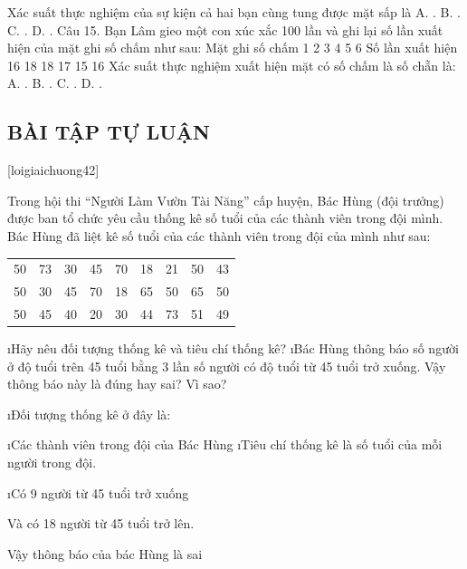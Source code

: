 Xác suất thực nghiệm của sự kiện cả hai bạn cùng tung được mặt sấp là
A.  .	B.  .	C.  .	D.  .
Câu 15. Bạn Lâm gieo một con xúc xắc 100 lần và ghi lại số lần xuất hiện của mặt ghi số chấm như sau:
Mặt ghi số chấm 	1	2	3	4	5	6
Số lần xuất hiện	16	18	18	17	15	16
Xác suất thực nghiệm xuất hiện mặt có số chấm là số chẵn là:
A. .		B.  .	C. .	D. .
\subsection{BÀI TẬP TỰ LUẬN}
[loigiaichuong42]
\begin{bt}
	Trong hội thi “Người Làm Vườn Tài Năng” cấp huyện, Bác Hùng (đội trưởng) được ban tổ chức yêu cầu thống kê số tuổi của các thành viên trong đội mình. Bác Hùng đã liệt kê số tuổi của các thành viên trong đội của mình như sau:
	\begin{center}
		\begin{tabular}{|c c c c c c c c c|}
			\hline
			50 & 73& 30& 45& 70& 18& 21& 50& 43 \\
			50& 30& 45& 70& 18& 65& 50& 65& 50\\
			50&45&40&20&30&44&73&51&49\\
			\hline
		\end{tabular}
	\end{center}
	\begin{enumerate}[a),leftmargin=*]
		\i Hãy nêu đối tượng thống kê và tiêu chí thống kê?
		\i Bác Hùng thông báo số người ở độ tuổi trên 45 tuổi bằng 3 lần số người có độ tuổi từ 45 tuổi trở xuống. Vậy thông báo này là đúng hay sai? Vì sao?
	\end{enumerate}
	\begin{loigiaichuong42}
		\begin{enumerate}[a),leftmargin=*]
			\i Đối tượng thống kê ở đây là:
			\begin{enumerate}[+,leftmargin=*]
				\i Các thành viên trong đội của Bác Hùng
				\i Tiêu chí thống kê là số tuổi của mỗi người trong đội.
			\end{enumerate}
			\i Có 9 người từ  45 tuổi trở xuống
			
			Và có 18 người từ 45 tuổi trở lên.
			
			Vậy thông báo của bác Hùng là sai 
		\end{enumerate}
	\end{loigiaichuong42}
\end{bt}
